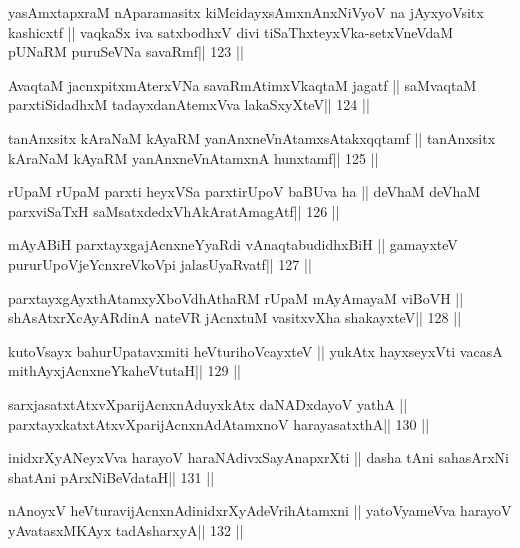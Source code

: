 \begin{shl}
yasAmxtapxraM nAparamasitx kiMcidayxsAmxnAnxNiVyoV na jAyxyoV\s sitx kashicxtf ||
vaqkaSx iva satxbodhxV divi tiSaThxteyxVka-setxVneVdaM pUNaRM puruSeVNa savaRmf\hfill || 123 ||
\end{shl}

\begin{shl}
AvaqtaM jacnxpitxmAterxVNa savaRmAtimxVkaqtaM jagatf ||
saMvaqtaM parxtiSidadhxM tadayxdanAtemxVva lakaSxyXteV\hfill || 124 ||
\end{shl}

\begin{shl}
tanAnxsitx kAraNaM kAyaRM yanAnxneVnA\s\s tamxsAtakxqqtamf ||
tanAnxsitx kAraNaM kAyaRM yanAnxneVnA\s\s tamxnA hunxtamf\hfill || 125 ||
\end{shl}

\begin{shl}
rUpaM rUpaM parxti heyxVSa parxtirUpoV baBUva ha ||
deVhaM deVhaM parxviSaTxH saMsatxdedxVhAkAratAmagAtf\hfill || 126 ||
\end{shl}

\begin{shl}
mAyABiH parxtayxgajAcnxneYyaRdi vA\s naqtabudidhxBiH ||
gamayxteV pururUpoV\s jeYcnxreVkoV\s pi jalasUyaRvatf\hfill || 127 ||
\end{shl}

\begin{shl}
parxtayxgAyxthAtamxyXboVdhAthaRM rUpaM mAyAmayaM viBoVH ||
shAsAtxrXcAyARdinA nateVR jAcnxtuM vasitxvXha shakayxteV\hfill || 128 ||
\end{shl}

\begin{shl}
kutoV\s sayx bahurUpatavxmiti heVturihoVcayxteV ||
yukAtx hayxseyxVti vacasA mithAyxjAcnxneYkaheVtutaH\hfill || 129 ||
\end{shl}

\begin{shl}
sarxjasatxtAtxvXparijAcnxnAduyxkAtx daNADxdayoV yathA ||
parxtayxkatxtAtxvXparijAcnxnAdAtamxnoV harayasatxthA\hfill || 130 ||
\end{shl}

\begin{shl}
inidxrXyANeyxVva harayoV haraNAdivxSayAnapxrXti ||
dasha tAni sahasArxNi shatAni pArxNiBeVdataH\hfill || 131 ||
\end{shl}

\begin{shl}
nAnoyxV heVturavijAcnxnAdinidxrXyAdeVrihA\s\s tamxni ||
yatoV\s yameVva harayoV yAvatasxMKAyx tadAsharxyA\hfill || 132 ||
\end{shl}

